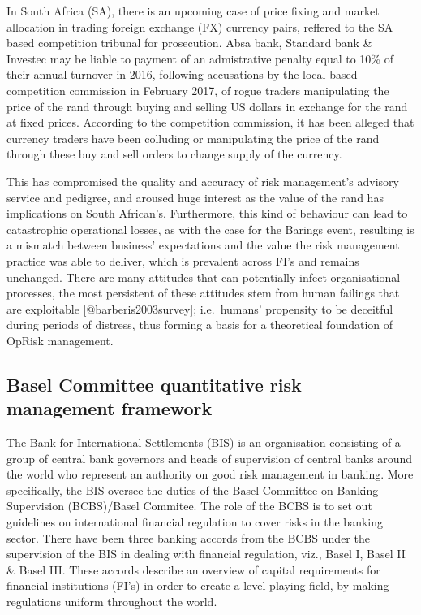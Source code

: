 \documentclass[]{article}
\begin{document}
In South Africa (SA), there is an upcoming case of price fixing and
market allocation in trading foreign exchange (FX) currency pairs,
reffered to the SA based competition tribunal for prosecution. Absa
bank, Standard bank \& Investec may be liable to payment of an
admistrative penalty equal to 10\% of their annual turnover in 2016,
following accusations by the local based competition commission in
February 2017, of rogue traders manipulating the price of the rand
through buying and selling US dollars in exchange for the rand at fixed
prices. According to the competition commission, it has been alleged
that currency traders have been colluding or manipulating the price of
the rand through these buy and sell orders to change supply of the
currency.\medskip

This has compromised the quality and accuracy of risk management's
advisory service and pedigree, and aroused huge interest as the value of
the rand has implications on South African's. Furthermore, this kind of
behaviour can lead to catastrophic operational losses, as with the case
for the Barings event, resulting is a mismatch between business'
expectations and the value the risk management practice was able to
deliver, which is prevalent across FI's and remains unchanged. There are
many attitudes that can potentially infect organisational processes, the
most persistent of these attitudes stem from human failings that are
exploitable {[}@barberis2003survey{]}; i.e.~humans' propensity to be
deceitful during periods of distress, thus forming a basis for a
theoretical foundation of OpRisk management.\medskip

\subsection{Basel Committee quantitative risk management framework}

The Bank for International Settlements (BIS) is an organisation
consisting of a group of central bank governors and heads of supervision
of central banks around the world who represent an authority on good
risk management in banking. More specifically, the BIS oversee the
duties of the Basel Committee on Banking Supervision (BCBS)/Basel
Commitee. The role of the BCBS is to set out guidelines on international
financial regulation to cover risks in the banking sector. There have
been three banking accords from the BCBS under the supervision of the
BIS in dealing with financial regulation, viz., Basel I, Basel II \&
Basel III. These accords describe an overview of capital requirements
for financial institutions (FI's) in order to create a level playing
field, by making regulations uniform throughout the world.\medskip 
\end{document}
